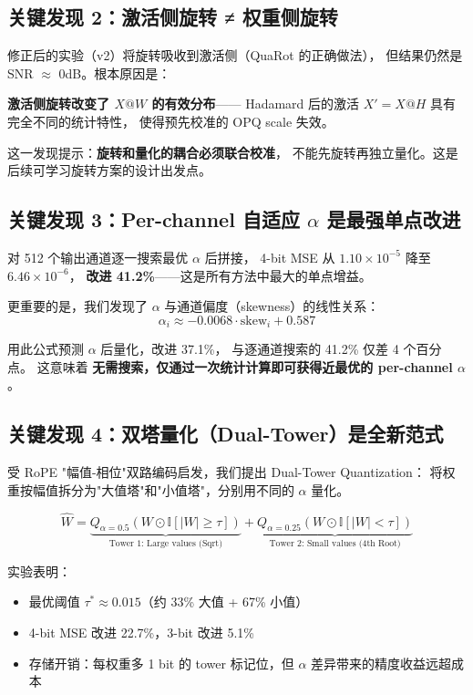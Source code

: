 \subsection{关键发现 2：激活侧旋转 ≠ 权重侧旋转}

修正后的实验（v2）将旋转吸收到激活侧（QuaRot 的正确做法），
但结果仍然是 SNR $\approx$ 0dB。根本原因是：

\textbf{激活侧旋转改变了 $X @ W$ 的有效分布}——
Hadamard 后的激活 $X' = X @ H$ 具有完全不同的统计特性，
使得预先校准的 OPQ scale 失效。

这一发现提示：\textbf{旋转和量化的耦合必须联合校准}，
不能先旋转再独立量化。这是后续可学习旋转方案的设计出发点。

\subsection{关键发现 3：Per-channel 自适应 $\alpha$ 是最强单点改进}

对 512 个输出通道逐一搜索最优 $\alpha$ 后拼接，
4-bit MSE 从 $1.10 \times 10^{-5}$ 降至 $6.46 \times 10^{-6}$，
\textbf{改进 41.2\%}——这是所有方法中最大的单点增益。

更重要的是，我们发现了 $\alpha$ 与通道偏度（skewness）的线性关系：
$$\alpha_i \approx -0.0068 \cdot \text{skew}_i + 0.587$$

用此公式预测 $\alpha$ 后量化，改进 37.1\%，
与逐通道搜索的 41.2\% 仅差 4 个百分点。
这意味着 \textbf{无需搜索，仅通过一次统计计算即可获得近最优的 per-channel $\alpha$}。

\subsection{关键发现 4：双塔量化（Dual-Tower）是全新范式}

受 RoPE "幅值-相位"双路编码启发，我们提出 Dual-Tower Quantization：
将权重按幅值拆分为"大值塔"和"小值塔"，分别用不同的 $\alpha$ 量化。

\begin{equation}
\hat{W} = \underbrace{Q_{\alpha=0.5}(W \odot \mathbb{I}[|W| \geq \tau])}_{\text{Tower 1: Large values (Sqrt)}}
       + \underbrace{Q_{\alpha=0.25}(W \odot \mathbb{I}[|W| < \tau])}_{\text{Tower 2: Small values (4th Root)}}
\end{equation}

实验表明：
\begin{itemize}
\item 最优阈值 $\tau^* \approx 0.015$（约 33\% 大值 + 67\% 小值）
\item 4-bit MSE 改进 22.7\%，3-bit 改进 5.1\%
\item 存储开销：每权重多 1 bit 的 tower 标记位，但 $\alpha$ 差异带来的精度收益远超成本
\end{itemize}

